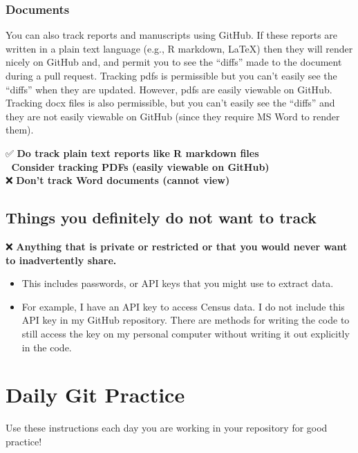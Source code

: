 \documentclass[
]{book}
\providecommand{\tightlist}{%
  \setlength{\itemsep}{0pt}\setlength{\parskip}{0pt}}
\begin{document}
\subsection{Documents}\label{documents}

You can also track reports and manuscripts using GitHub. If these reports are
written in a plain text language (e.g., R markdown, LaTeX) then they will render
nicely on GitHub and, and permit you to see the ``diffs'' made to the document
during a pull request. Tracking pdfs is permissible but you can't easily see the
``diffs'' when they are updated. However, pdfs are easily viewable on GitHub.
Tracking docx files is also permissible, but you can't easily see the ``diffs''
and they are not easily viewable on GitHub (since they require MS Word to render
them).

✅ \textbf{Do track plain text reports like R markdown files}\\
🤔 \textbf{Consider tracking PDFs (easily viewable on GitHub)}\\
❌ \textbf{Don't track Word documents (cannot view)}

\section{Things you definitely do not want to track}\label{things-you-definitely-do-not-want-to-track}

❌ \textbf{Anything that is private or restricted or that you would never want to
inadvertently share.}

\begin{itemize}
\tightlist
\item
  This includes passwords, or API keys that you might use to extract data.
\item
  For example, I have an API key to access Census data. I do not include this
  API key in my GitHub repository. There are methods for writing the code to still
  access the key on my personal computer without writing it out explicitly in the
  code.
\end{itemize}

\chapter{Daily Git Practice}\label{daily-git-practice}

Use these instructions each day you are working in your repository for good practice!
\end{document}
